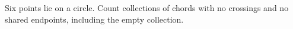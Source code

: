 Six points lie on a circle. Count collections of chords with no crossings and no shared endpoints, including the empty collection.
